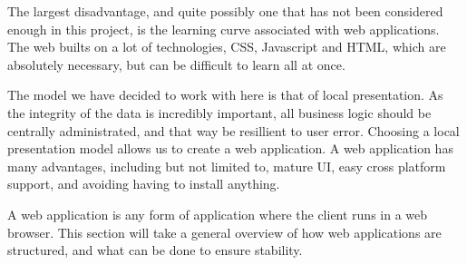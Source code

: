 The largest disadvantage, and quite possibly one that has not been considered enough in this project, is the learning curve associated with web applications. The web builts on a lot of technologies, CSS, Javascript and HTML, which are absolutely necessary, but can be difficult to learn all at once.

The model we have decided to work with here is that of local presentation.
As the integrity of the data is incredibly important, all business logic should be centrally administrated, and that way be resillient to user error.
Choosing a local presentation model allows us to create a web application.
A web application has many advantages, including but not limited to, mature UI, easy cross platform support, and avoiding having to install anything.

A web application is any form of application where the client runs in a web browser.
This section will take a general overview of how web applications are structured, and what can be done to ensure stability.
